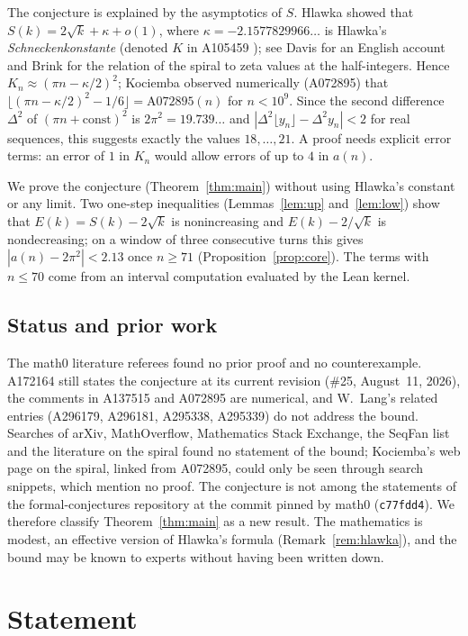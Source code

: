 \documentclass[11pt]{amsart}
\theoremstyle{plain}
\theoremstyle{definition}
\begin{document}
The conjecture is explained by the asymptotics of $S$.
Hlawka \cite{Hl80} showed that $S(k)=2\sqrt k+\kappa+o(1)$, where $\kappa=-2.1577829966\ldots$ is Hlawka's \emph{Schneckenkonstante} (denoted $K$ in A105459 \cite{A105459}); see Davis \cite[pp.~157--167]{Da93} for an English account and Brink \cite{Br12} for the relation of the spiral to zeta values at the half-integers.
Hence $K_n\approx(\pi n-\kappa/2)^2$; Kociemba observed numerically (A072895) that $\lfloor(\pi n-\kappa/2)^2-1/6\rfloor=\text{A072895}(n)$ for $n<10^9$.
Since the second difference $\Delta^2$ of $(\pi n+\text{const})^2$ is $2\pi^2=19.739\ldots$ and $|\Delta^2\lfloor y_n\rfloor-\Delta^2y_n|<2$ for real sequences, this suggests exactly the values $18,\dots,21$.
A proof needs explicit error terms: an error of $1$ in $K_n$ would allow errors of up to $4$ in $a(n)$.

We prove the conjecture (Theorem~\ref{thm:main}) without using Hlawka's constant or any limit.
Two one-step inequalities (Lemmas~\ref{lem:up} and~\ref{lem:low}) show that $E(k)=S(k)-2\sqrt k$ is nonincreasing and $E(k)-2/\sqrt k$ is nondecreasing; on a window of three consecutive turns this gives $|a(n)-2\pi^2|<2.13$ once $n\ge71$ (Proposition~\ref{prop:core}).
The terms with $n\le70$ come from an interval computation evaluated by the Lean kernel.

\subsection*{Status and prior work}
The math0 literature referees found no prior proof and no counterexample.
A172164 still states the conjecture at its current revision (\#25, August~11, 2026), the comments in A137515 and A072895 are numerical, and W.~Lang's related entries (A296179, A296181, A295338, A295339) do not address the bound.
Searches of arXiv, MathOverflow, Mathematics Stack Exchange, the SeqFan list and the literature on the spiral \cite{Hl80,Da93,Br12} found no statement of the bound; Kociemba's web page on the spiral, linked from A072895, could only be seen through search snippets, which mention no proof.
The conjecture is not among the statements of the formal-conjectures repository \cite{FC} at the commit pinned by math0 (\texttt{c77fdd4}).
We therefore classify Theorem~\ref{thm:main} as a new result. The mathematics is modest, an effective version of Hlawka's formula (Remark~\ref{rem:hlawka}), and the bound may be known to experts without having been written down.

\section{Statement}\label{sec:statement}
\end{document}

